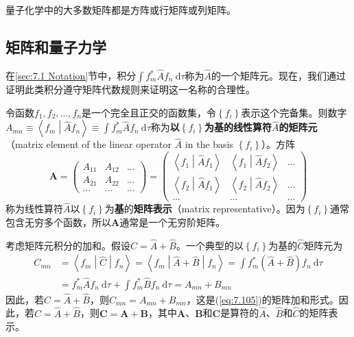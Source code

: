     量子化学中的大多数矩阵都是方阵或行矩阵或列矩阵。

\subsection*{矩阵和量子力学}

    在\ref{sec:7.1 Notation}节中，积分$\int f_m^{\ast}\hat{A}f_n \: \mathrm{d}\tau$称为$\hat{A}$的一个矩阵元。现在，我们通过证明此类积分遵守矩阵代数规则来证明这一名称的合理性。

    令函数$f_1, f_2, \ldots, f_n$是一个完全且正交的函数集，令$\left\{f_i\right\}$表示这个完备集。则数字$A_{mn} \equiv \left\langle f_m \middle| \hat{A} f_n \right\rangle \equiv \int f_m^{\ast}\hat{A}f_n \: \mathrm{d}\tau$称为\textbf{以$\left\{f_i\right\}$为基的线性算符$\hat{A}$的矩阵元}（matrix element of the linear operator $\hat{A}$ in the basis $\left\{f_i\right\}$）。方阵
    \begin{equation}
        \mathbf{A} = \begin{pmatrix}
            A_{11} & A_{12} & \ldots \\
            A_{21} & A_{22} & \ldots \\
            \ldots & \ldots & \ldots 
        \end{pmatrix}
        = \begin{pmatrix}
            \left\langle f_1 \middle| \hat{A} f_1 \right\rangle & \left\langle f_1 \middle| \hat{A} f_2 \right\rangle & \ldots \\
            \left\langle f_2 \middle| \hat{A} f_1 \right\rangle & \left\langle f_2 \middle| \hat{A} f_2 \right\rangle & \ldots \\
            \ldots & \ldots & \ldots
        \end{pmatrix}
        \label{eq:7.108}
    \end{equation}
    称为线性算符$\hat{A}$以$\left\{f_i\right\}$为\textbf{基}的\textbf{矩阵表示}（matrix representative）。因为$\left\{f_i\right\}$通常包含无穷多个函数，所以$\mathbf{A}$通常是一个无穷阶矩阵。

    考虑矩阵元积分的加和。假设$\hat{C} = \hat{A} + \hat{B}$。一个典型的以$\left\{f_i\right\}$为基的$\hat{C}$矩阵元为
    \begin{equation*}
        \begin{aligned}
            C_{mn} &= \left\langle f_m \middle| \hat{C} \middle| f_n \right\rangle = \left\langle f_m \middle| \hat{A} + \hat{B} \middle| f_n \right\rangle = \int f_m^{\ast}\left(\hat{A} + \hat{B}\right)f_n \: \mathrm{d}\tau \\
            &= f_m^{\ast}\hat{A}f_n\:\mathrm{d}\tau + \int f_m^{\ast}\hat{B}f_n \: \mathrm{d}\tau = A_{mn} + B_{mn}
        \end{aligned}
    \end{equation*}
    因此，若$\hat{C} = \hat{A} + \hat{B}$，则$C_{mn} = A_{mn} + B_{mn}$，这是(\ref{eq:7.105})的矩阵加和形式。因此，若$\hat{C} = \hat{A} + \hat{B}$，则$\mathbf{C} = \mathbf{A} + \mathbf{B}$，其中$\mathbf{A}$、$\mathbf{B}$和$\mathbf{C}$是算符的$\hat{A}$、$\hat{B}$和$\hat{C}$的矩阵表示。

